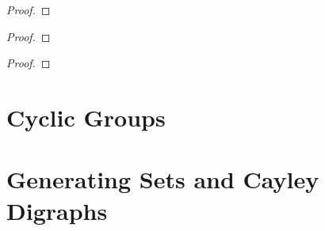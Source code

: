 \begin{proof}
\end{proof}

\begin{exercise}
\end{exercise}

\begin{proof}
\end{proof}

\begin{exercise}
\end{exercise}

\begin{proof}
\end{proof}

\section{Cyclic Groups}

\section{Generating Sets and Cayley Digraphs}
